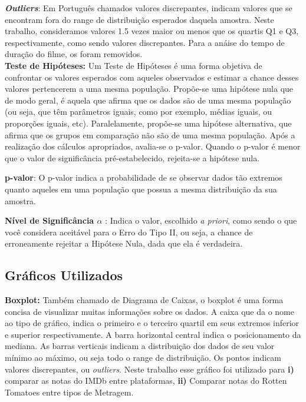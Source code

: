 \documentclass[a4paper, 12pt]{article} %
\begin{document}
\textbf{\emph{Outliers}}: Em Português chamados valores discrepantes, indicam valores que se encontram fora do range de distribuição esperados daquela amostra. Neste trabalho, consideramos valores 1.5 vezes maior ou menos que os quartis Q1 e Q3, respectivamente, como sendo valores discrepantes. Para a anáise do tempo de duração do filme, os  foram removidos.\\

\textbf{Teste de Hipóteses:} Um Teste de Hipóteses é uma forma objetiva de confrontar os valores esperados com aqueles observados e estimar a chance desses valores pertencerem a uma mesma população. Propõe-se uma hipótese nula que de modo geral, é aquela que afirma  que os dados são de uma mesma população (ou seja, que têm parâmetros iguais, como por exemplo, médias iguais, ou proporções iguais, etc). Paralelamente, propõe-se uma hipótese alternativa, que afirma que os grupos em comparação não são de uma mesma população. Após a realização dos cálculos apropriados, avalia-se o p-valor. Quando o p-valor é menor que o valor de significância pré-estabelecido, rejeita-se a hipótese nula.

\textbf{p-valor}: O p-valor indica a probabilidade de se observar dados tão extremos quanto aqueles em uma população que possua a mesma distribuição da sua amostra. 

\textbf{Nível de Significância $\alpha$} : Indica o valor, escolhido \emph{a priori}, como sendo o que você considera aceitável para o Erro do Tipo II, ou seja, a chance de erroneamente rejeitar a Hipótese Nula, dada que ela é verdadeira. 

\subsection{Gráficos Utilizados}

\textbf{Boxplot:} Também chamado de Diagrama de Caixas, o boxplot é uma forma concisa de visualizar muitas informações sobre os dados. A caixa que da o nome ao tipo de gráfico, indica o primeiro e o terceiro quartil em seus extremos inferior e superior respectivamente. A barra horizontal central indica o posicionamento da mediana.  As barras verticais indicam a distribuição dos dados de seu valor mínimo ao máximo, ou seja todo o range de distribuição. Os pontos indicam valores discrepantes, ou \emph{outliers}. Neste trabalho esse gráfico foi utilizado para \textbf{i)} comparar as notas do IMDb entre plataformas, \textbf{ii)} Comparar notas do Rotten Tomatoes entre tipos de Metragem.\\
\end{document}
